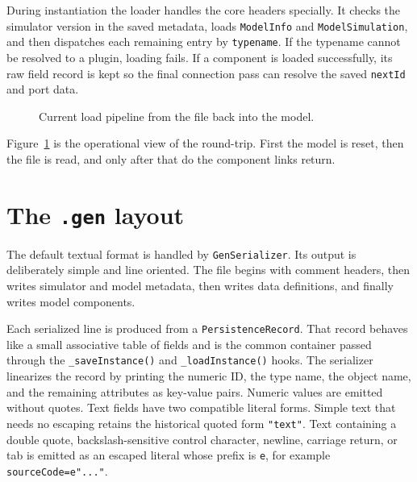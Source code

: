 During instantiation the loader handles the core headers specially. It checks
the simulator version in the saved metadata, loads \texttt{ModelInfo} and
\texttt{ModelSimulation}, and then dispatches each remaining entry by
\texttt{typename}. If the typename cannot be resolved to a plugin, loading
fails. If a component is loaded successfully, its raw field record is kept so
the final connection pass can resolve the saved \texttt{nextId} and port data.

\begin{figure}[htbp]
\centering
\caption{Current load pipeline from the file back into the model.}
\label{fig:model-persistence-load-pipeline}
\end{figure}

Figure~\ref{fig:model-persistence-load-pipeline} is the operational view of
the round-trip. First the model is reset, then the file is read, and only after
that do the component links return.

\section{The \texttt{.gen} layout}
\label{sec:model-persistence-gen-layout}

The default textual format is handled by \texttt{GenSerializer}. Its output is
deliberately simple and line oriented. The file begins with comment headers,
then writes simulator and model metadata, then writes data definitions, and
finally writes model components.

Each serialized line is produced from a \texttt{PersistenceRecord}. That record
behaves like a small associative table of fields and is the common container
passed through the \texttt{\_saveInstance()} and \texttt{\_loadInstance()} hooks.
The serializer linearizes the record by printing the numeric ID, the type name,
the object name, and the remaining attributes as key-value pairs. Numeric values
are emitted without quotes. Text fields have two compatible literal forms.
Simple text that needs no escaping retains the historical quoted form
\texttt{"text"}. Text containing a double quote, backslash-sensitive control
character, newline, carriage return, or tab is emitted as an escaped literal
whose prefix is \texttt{e}, for example \texttt{sourceCode=e"..."}.

